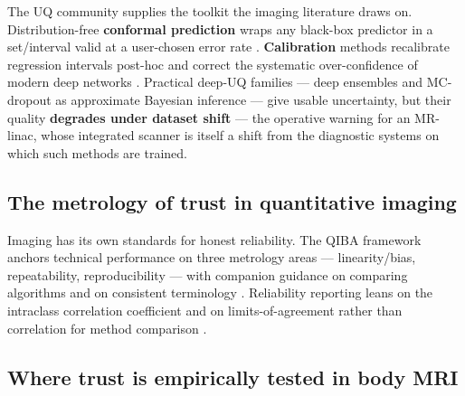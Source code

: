 \documentclass[review,number]{elsarticle}
\begin{document}
The UQ community supplies the toolkit the imaging literature draws on. Distribution-free
\textbf{conformal prediction} wraps any black-box predictor in a set/interval valid at a
user-chosen error rate \cite{shafer2008,angelopoulos2021}. \textbf{Calibration} methods
recalibrate regression intervals post-hoc \cite{kuleshov2018} and correct the systematic
over-confidence of modern deep networks \cite{guo2017}. Practical deep-UQ families ---
deep ensembles \cite{lakshminarayanan2017} and MC-dropout as approximate Bayesian
inference \cite{gal2016} --- give usable
uncertainty, but their quality \textbf{degrades under dataset shift}
\cite{ovadia2019} --- the operative warning for an MR-linac, whose integrated scanner is
itself a shift from the diagnostic systems on which such methods are trained.

\subsection{The metrology of trust in quantitative imaging}
\label{sec:trust-metrology}

Imaging has its own standards for honest reliability. The QIBA framework anchors
technical performance on three metrology areas --- linearity/bias, repeatability,
reproducibility \cite{raunig2015} --- with companion guidance on comparing algorithms
\cite{obuchowski2015} and on consistent terminology \cite{sullivan2015}. Reliability
reporting leans on the intraclass correlation coefficient
\cite{koo2016}%
{} and on limits-of-agreement rather than correlation for method comparison
\cite{blandaltman1986}.%

\subsection{Where trust is empirically tested in body MRI}
\label{sec:trust-bodymri}
\end{document}
